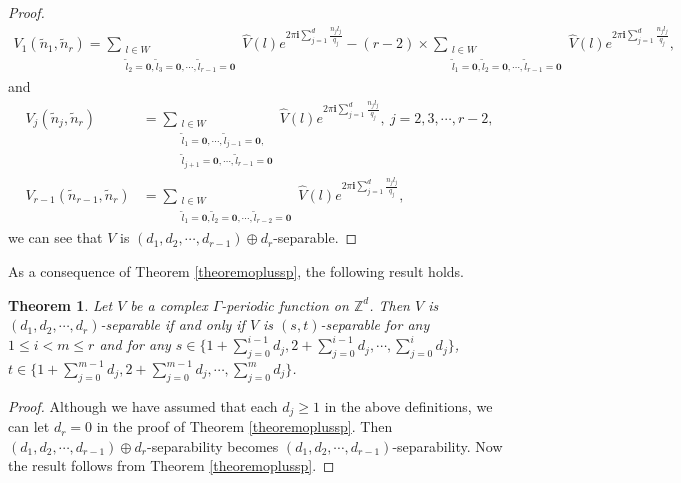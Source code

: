 \documentclass[12pt,letterpaper]{amsart}
\newtheorem{theorem}{Theorem}[section]
\begin{document}
{\begin{proof}
\begin{align}
	V_1(\tilde{n}_1,\tilde{n}_r)=\sum_{\substack{l\in W\\ \tilde{l}_2=\mathbf{0},\tilde{l}_3=\mathbf{0},\cdots,\tilde{l}_{r-1}=\mathbf{0}}}\hat{V}(l)e^{2\pi\mathbf{i}\sum_{j=1}^d\frac{n_jl_j}{q_j}}-(r-2)\times\sum_{\substack{l\in W\\ \tilde{l}_1=\mathbf{0},\tilde{l}_2=\mathbf{0},\cdots,\tilde{l}_{r-1}=\mathbf{0}}}\hat{V}(l)e^{2\pi\mathbf{i}\sum_{j=1}^d\frac{n_jl_j}{q_j}},\nonumber
\end{align}
and
\begin{align}
	V_j(\tilde{n}_j,\tilde{n}_r)&=\sum_{\substack{l\in W\\ \tilde{l}_1=\mathbf{0},\cdots,\tilde{l}_{j-1}=\mathbf{0},\\\tilde{l}_{j+1}=\mathbf{0},\cdots,\tilde{l}_{r-1}=\mathbf{0}}}\hat{V}(l)e^{2\pi\mathbf{i}\sum_{j=1}^d\frac{n_jl_j}{q_j}}, \ j=2,3,\cdots,r-2,\nonumber\\
	V_{r-1}(\tilde{n}_{r-1},\tilde{n}_r)&=\sum_{\substack{l\in W\\ \tilde{l}_1=\mathbf{0},\tilde{l}_2=\mathbf{0},\cdots,\tilde{l}_{r-2}=\mathbf{0}}}\hat{V}(l)e^{2\pi\mathbf{i}\sum_{j=1}^d\frac{n_jl_j}{q_j}},\nonumber
\end{align}
we can see that $V$ is $(d_1,d_2,\cdots,d_{r-1})\oplus d_r$-separable.
\end{proof}
}

As a consequence of Theorem \ref{theoremoplussp}, the following result holds.
\begin{theorem}\label{d1d2drnewsepafermith}
	Let $V$ be a complex $\Gamma$-periodic function on $\mathbb{Z}^d$. Then $V$ is $(d_1,d_2,\cdots,d_r)$-separable if and only if
	$V$ is $(s,t)$-separable for any $1\leq i<m\leq r$ and for any $s\in \{1+\sum_{j=0}^{i-1}d_j,2+\sum_{j=0}^{i-1}d_j,\cdots,\sum_{j=0}^{i}d_j\}$, $t\in \{1+\sum_{j=0}^{m-1}d_j,2+\sum_{j=0}^{m-1}d_j,\cdots,\sum_{j=0}^{m}d_j\}$.
\end{theorem}
\begin{proof}
Although we have assumed that each $d_j\geq 1$ in the above definitions, we can let $d_r=0$ in the proof of Theorem \ref{theoremoplussp}. Then $(d_1,d_2,\cdots,d_{r-1})\oplus d_r$-separability becomes $(d_1,d_2,\cdots,d_{r-1})$-separability. Now the result follows from Theorem \ref{theoremoplussp}.
\end{proof}
\end{document}
